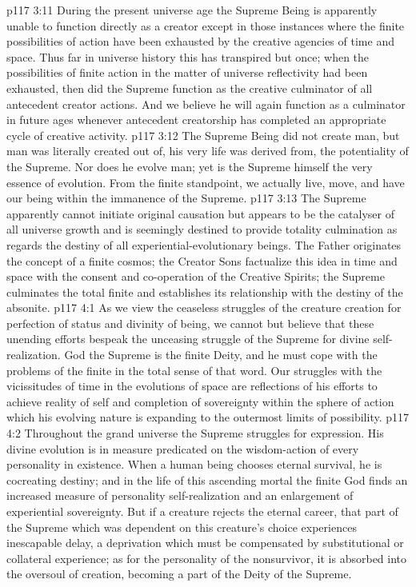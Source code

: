 \vs p117 3:11 \pc During the present universe age the Supreme Being is apparently unable to function directly as a creator except in those instances where the finite possibilities of action have been exhausted by the creative agencies of time and space. Thus far in universe history this has transpired but once; when the possibilities of finite action in the matter of universe reflectivity had been exhausted, then did the Supreme function as the creative culminator of all antecedent creator actions. And we believe he will again function as a culminator in future ages whenever antecedent creatorship has completed an appropriate cycle of creative activity.
\vs p117 3:12 The Supreme Being did not create man, but man was literally created out of, his very life was derived from, the potentiality of the Supreme. Nor does he evolve man; yet is the Supreme himself the very essence of evolution. From the finite standpoint, we actually live, move, and have our being within the immanence of the Supreme.
\vs p117 3:13 The Supreme apparently cannot initiate original causation but appears to be the catalyser of all universe growth and is seemingly destined to provide totality culmination as regards the destiny of all experiential\hyp{}evolutionary beings. The Father originates the concept of a finite cosmos; the Creator Sons factualize this idea in time and space with the consent and co\hyp{}operation of the Creative Spirits; the Supreme culminates the total finite and establishes its relationship with the destiny of the absonite.
\vs p117 4:1 As we view the ceaseless struggles of the creature creation for perfection of status and divinity of being, we cannot but believe that these unending efforts bespeak the unceasing struggle of the Supreme for divine self\hyp{}realization. God the Supreme is the finite Deity, and he must cope with the problems of the finite in the total sense of that word. Our struggles with the vicissitudes of time in the evolutions of space are reflections of his efforts to achieve reality of self and completion of sovereignty within the sphere of action which his evolving nature is expanding to the outermost limits of possibility.
\vs p117 4:2 Throughout the grand universe the Supreme struggles for expression. His divine evolution is in measure predicated on the wisdom\hyp{}action of every personality in existence. When a human being chooses eternal survival, he is cocreating destiny; and in the life of this ascending mortal the finite God finds an increased measure of personality self\hyp{}realization and an enlargement of experiential sovereignty. But if a creature rejects the eternal career, that part of the Supreme which was dependent on this creature’s choice experiences inescapable delay, a deprivation which must be compensated by substitutional or collateral experience; as for the personality of the nonsurvivor, it is absorbed into the oversoul of creation, becoming a part of the Deity of the Supreme.
